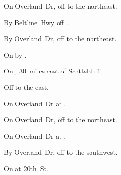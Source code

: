 
\begin{LocationList}

On Overland~Dr, off   to the northeast.

By Beltline~Hwy off .

\Location{\GarageHQ \Garage}
By Overland~Dr, off   to the northeast.

On  by .

On , 30~miles east of Scottsbluff.

Off  to the east.

On Overland~Dr at  .

\Location{\TruckService \Service}
On Overland~Dr, off   to the northeast.

\Location{\TruckStop \Gas \Rest}
On Overland~Dr at  .

By Overland~Dr, off   to the southwest.

On  at 20th~St.

\end{LocationList}
